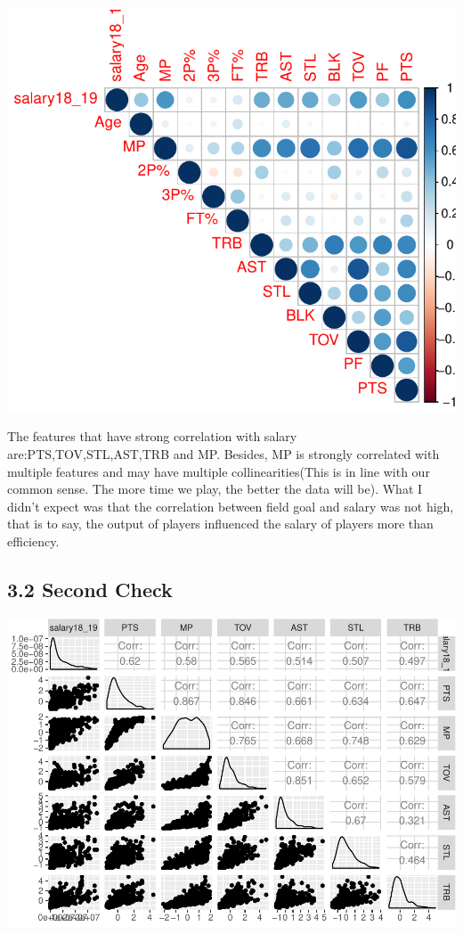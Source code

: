 \documentclass[]{article}
\begin{document}
\includegraphics{Final_Report_files/figure-latex/unnamed-chunk-11-1.pdf}

The features that have strong correlation with salary
are:PTS,TOV,STL,AST,TRB and MP. Besides, MP is strongly correlated with
multiple features and may have multiple collinearities(This is in line
with our common sense. The more time we play, the better the data will
be). What I didn't expect was that the correlation between field goal
and salary was not high, that is to say, the output of players
influenced the salary of players more than efficiency.

\subsection{3.2 Second Check}\label{second-check}

\includegraphics{Final_Report_files/figure-latex/unnamed-chunk-12-1.pdf}
\end{document}
